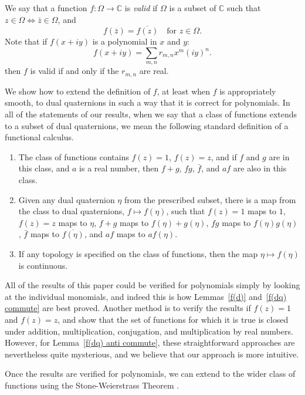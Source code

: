 \documentclass[12pt,reqno]{amsart}
\begin{document}
We say that a function $f:\Omega \to \mathbb C$ is \emph{valid} if $\Omega$ is a subset of $\mathbb C$ such that $z\in\Omega \Leftrightarrow \bar z \in \Omega$, and
\begin{equation}
f(\bar z) = \overline{f(z)} \quad \text{for $z \in \Omega$.}
\end{equation}
Note that if $f(x+iy)$ is a polynomial in $x$ and $y$:
\begin{equation}
f(x+iy) = \sum_{m,n} r_{m,n} x^m (iy)^n.
\end{equation}
then $f$ is valid if and only if the $r_{m,n}$ are real.

We show how to extend the definition of $f$, at least when $f$ is appropriately smooth, to dual quaternions in such a way that it is correct for polynomials.  In all of the statements of our results, when we say that a class of functions extends to a subset of dual quaternions, we mean the following standard definition of a functional calculus.
\begin{enumerate}
\item The class of functions contains $f(z) = 1$, $f(z) = z$, and if $f$ and $g$ are in this class, and $a$ is a real number, then $f+g$, $fg$, $\bar f$, and $a f$ are also in this class.
\item Given any dual quaternion $\eta$ from the prescribed subset, there is a map from the class to dual quaternions, $f \mapsto f(\eta)$, such that $f(z) = 1$ maps to $1$, $f(z) = z$ maps to $\eta$, $f+g$ maps to $f(\eta) + g(\eta)$, $fg$ maps to $f(\eta) g(\eta)$, $\bar f$ maps to $\overline{f(\eta)}$, and $a f$ maps to $a f(\eta)$.
\item If any topology is specified on the class of functions, then the map $\eta \mapsto f(\eta)$ is continuous.
\end{enumerate}
All of the results of this paper could be verified for polynomials simply by looking at the individual monomials, and indeed this is how Lemmas~\ref{f(d)} and~\ref{f(dq) commute} are best proved.  Another method is to verify the results if $f(z) = 1$ and $f(z) = z$, and show that the set of functions for which it is true is closed under addition, multiplication, conjugation, and multiplication by real numbers.  However, for Lemma~\ref{f(dq) anti commute}, these straightforward approaches are nevertheless quite mysterious, and we believe that our approach is more intuitive.

Once the results are verified for polynomials, we can extend to the wider class of functions using the Stone-Weierstrass Theorem \cite{rudin}.
\end{document}
